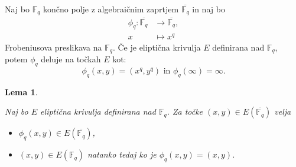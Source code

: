 \documentclass[12pt,a4paper,twoside]{article}
\theoremstyle{definition} %
\theoremstyle{plain} %
\newtheorem{lema}[definicija]{Lema}
\numberwithin{equation}{section}  %
\newcommand{\F}{\mathbb F}
\newcommand{\E}[1]{E({#1})}
\begin{document}
Naj bo $\F_q$ končno polje z algebraičnim zaprtjem $\overline{\F_q}$ in naj bo
\begin{align}
\phi_q:\overline{\F_q} &{} \rightarrow \overline{\F_q}, \nonumber \\
x &{} \mapsto x^q \nonumber
\end{align}
Frobeniusova preslikava na $\F_q$.
Če je eliptična krivulja $E$ definirana nad $\F_q$, potem $\phi_q$ deluje na točkah $E$ kot:
$$\phi_q(x,y) = (x^q,y^q) \text{ in } \phi_q(\infty) = \infty.$$

\begin{lema}
\label{lema:4.5}

Naj bo $E$ eliptična krivulja definirana nad $\F_q$. Za točke $(x,y) \in \E{\overline{\F_q}}$ velja
\begin{itemize}

\item $\phi_q(x,y) \in \E{\overline{\F_q}}$,
\item $(x,y) \in \E{\F_q}$ natanko tedaj ko je $\phi_q(x,y) = (x,y)$.


\end{itemize}

\end{lema}
\end{document}
